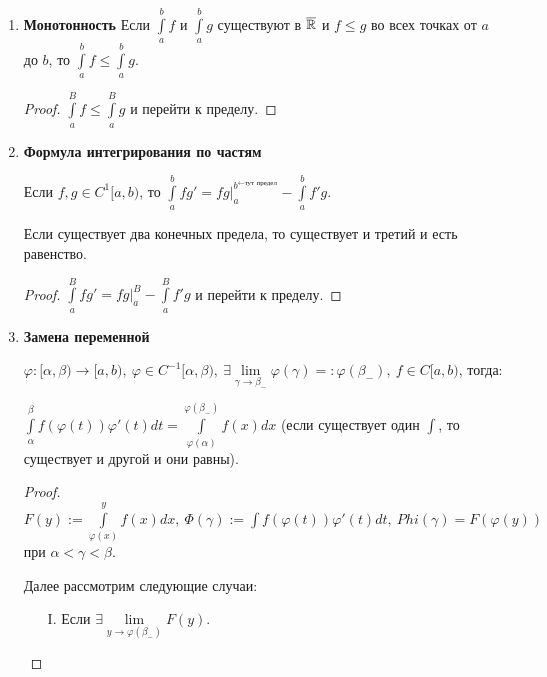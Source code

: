\begin{statement}
\begin{enumerate}
\begin{proof}
            и $\int\limits_a^b (\alpha f + \beta g)=\alpha\lim\limits_{B\rightarrow b_-}F(B) + \beta\lim\limits_{B\rightarrow b_-} G(B)-\alpha \cdot F(A) - \beta \cdot G(A)=\alpha \cdot \int\limits_a^b f+\beta \cdot \int\limits_a^b g$
        \end{proof}
        \begin{remark}
            Если $\int\limits_a^b f$ сходится и $\int\limits_a^b g$ расходится, то $\int\limits_a^b(f+g)$ расходится.
        \end{remark}

        Комментарий: $g=(f+g)-f$
        \item \textbf{Монотонность}
        Если $\int\limits_a^b f$ и $\int\limits_a^b g$ существуют в $\overline{\mathbb{R}}$ и $f\leq g$ во всех точках от $a$ до $b$, то $\int\limits_a^b f \leq \int\limits_a^b g$.
        \begin{proof}
            $\int\limits_a^B f\leq \int\limits_a^B g$ и перейти к пределу.
        \end{proof}
        \item \textbf{Формула интегрирования по частям}

        Если $f, g\in C^{1}[a,b)$, то $\int\limits_a^b fg' = fg\left.\right|_a^{b^{\leftarrow\text{тут предел}}}-\int\limits_a^bf'g$.

        Если существует два конечных предела, то существует и третий и есть равенство.
        \begin{proof}
            $\int\limits_a^B fg' = fg\left.\right|_a^B-\int\limits_a^Bf'g$ и перейти к пределу.
        \end{proof}
        \item \textbf{Замена переменной}

        $\varphi: [\alpha, \beta)\rightarrow [a, b),\ \varphi\in C^{-1}[\alpha, \beta),\ \exists \lim\limits_{\gamma \rightarrow \beta_-}\varphi(\gamma)=:\varphi(\beta_-),\ f\in C[a,b)$, тогда:

        $\int\limits_\alpha^\beta f(\varphi(t))\varphi'(t)dt=\int\limits_{\varphi(\alpha)}^{\varphi(\beta_-)}f(x)dx$ (если существует один $\int$, то существует и другой и они равны).

        \begin{proof}
            $F(y):=\int\limits_{\varphi(x)}^y f(x)dx,\ \Phi(\gamma):=\int\limits f(\varphi(t))\varphi'(t)dt,\ Phi(\gamma)=F(\varphi(y))$ при $\alpha<\gamma<\beta$.

            Далее рассмотрим следующие случаи:
            \begin{enumerate}
                \item[I.] Если $\exists \lim\limits_{y\rightarrow \varphi (\beta_-)} F(y)$.


\end{enumerate}
\end{proof}
\end{enumerate}
\end{statement}
